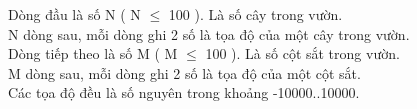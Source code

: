 Dòng đầu là số N ( N  $\le$  100 ). Là số cây trong vườn.   
\\   N dòng sau, mỗi dòng ghi 2 số là tọa độ của một cây trong vườn.   
\\   Dòng tiếp theo là số M ( M  $\le$  100 ). Là số cột sắt trong vườn.   
\\   M dòng sau, mỗi dòng ghi 2 số là tọa độ của một cột sắt.   
\\   Các tọa độ đều là số nguyên trong khoảng -10000..10000.  

\